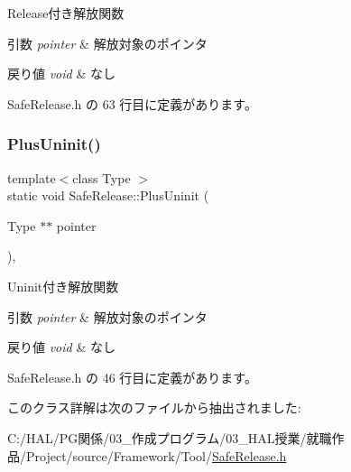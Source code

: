 Release付き解放関数 


\begin{DoxyParams}{引数}
{\em pointer} & 解放対象のポインタ \\
\hline
\end{DoxyParams}

\begin{DoxyRetVals}{戻り値}
{\em void} & なし \\
\hline
\end{DoxyRetVals}


 Safe\+Release.\+h の 63 行目に定義があります。

\mbox{\label{class_safe_release_a06160f5466a88f021e6f28489de9df1e}} 
\subsubsection{\texorpdfstring{Plus\+Uninit()}{PlusUninit()}}
{\footnotesize\ttfamily template$<$class Type $>$ \\
static void Safe\+Release\+::\+Plus\+Uninit (\begin{DoxyParamCaption}\item[{Type $\ast$$\ast$}]{pointer }\end{DoxyParamCaption})\hspace{0.3cm}{\ttfamily [inline]}, {\ttfamily [static]}}



Uninit付き解放関数 


\begin{DoxyParams}{引数}
{\em pointer} & 解放対象のポインタ \\
\hline
\end{DoxyParams}

\begin{DoxyRetVals}{戻り値}
{\em void} & なし \\
\hline
\end{DoxyRetVals}


 Safe\+Release.\+h の 46 行目に定義があります。



このクラス詳解は次のファイルから抽出されました\+:\begin{DoxyCompactItemize}
\item 
C\+:/\+H\+A\+L/\+P\+G関係/03\+\_\+作成プログラム/03\+\_\+\+H\+A\+L授業/就職作品/\+Project/source/\+Framework/\+Tool/\mbox{\hyperlink{_safe_release_8h}{Safe\+Release.\+h}}\end{DoxyCompactItemize}
